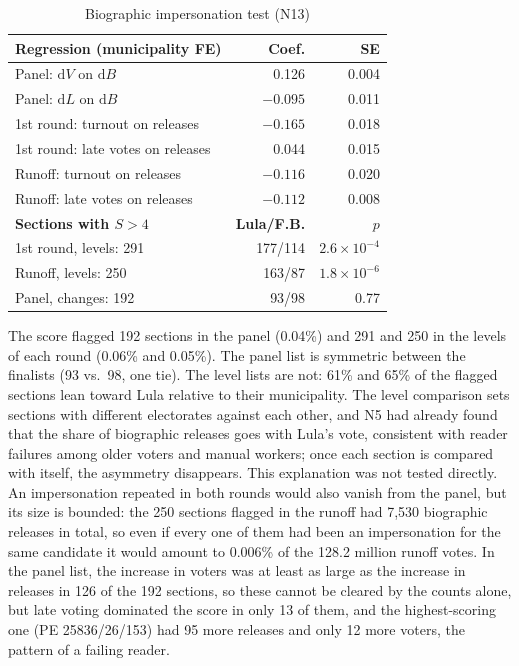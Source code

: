 \begin{table}[ht]
\caption{Biographic impersonation test (N13)}
\label{tab:n13}
\centering\scriptsize
\begin{tabular}{@{}L{3.4cm} r r@{}}
\toprule
\textbf{Regression (municipality FE)} & \textbf{Coef.} & \textbf{SE} \\
\midrule
Panel: $\mathrm{d}V$ on $\mathrm{d}B$ & 0.126 & 0.004 \\
Panel: $\mathrm{d}L$ on $\mathrm{d}B$ & $-0.095$ & 0.011 \\
1st round: turnout on releases & $-0.165$ & 0.018 \\
1st round: late votes on releases & 0.044 & 0.015 \\
Runoff: turnout on releases & $-0.116$ & 0.020 \\
Runoff: late votes on releases & $-0.112$ & 0.008 \\
\midrule
\textbf{Sections with $S>4$} & \textbf{Lula/F.B.} & \textbf{$p$} \\
\midrule
1st round, levels: 291 & 177/114 & $2.6\times10^{-4}$ \\
Runoff, levels: 250 & 163/87 & $1.8\times10^{-6}$ \\
Panel, changes: 192 & 93/98 & 0.77 \\
\bottomrule
\end{tabular}
\end{table}

The score flagged 192 sections in the panel (0.04\%) and 291 and 250 in the
levels of each round (0.06\% and 0.05\%). The panel list is symmetric
between the finalists (93 vs.\ 98, one tie). The level lists are not: 61\%
and 65\% of the flagged sections lean toward Lula relative to their
municipality. The level comparison sets sections with different electorates
against each other, and N5 had already found that the share of biographic
releases goes with Lula's vote, consistent with reader failures among older
voters and manual workers; once each section is compared with itself, the
asymmetry disappears. This explanation was not tested directly. An
impersonation repeated in both rounds would also vanish from the panel, but
its size is bounded: the 250 sections flagged in the runoff had 7,530
biographic releases in total, so even if every one of them had been an
impersonation for the same candidate it would amount to 0.006\% of the
128.2 million runoff votes. In the panel list, the increase in voters was at
least as large as the increase in releases in 126 of the 192 sections, so
these cannot be cleared by the counts alone, but late voting dominated the
score in only 13 of them, and the highest-scoring one (PE 25836/26/153) had
95 more releases and only 12 more voters, the pattern of a failing reader.

